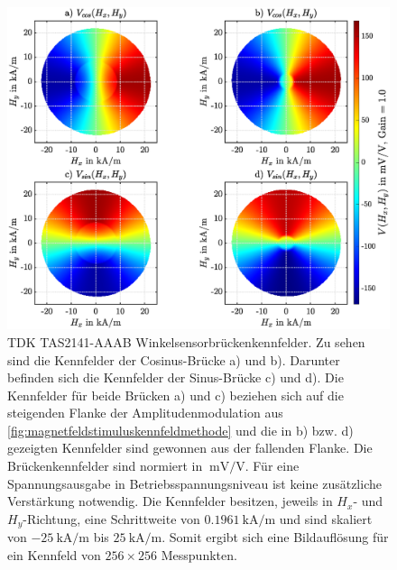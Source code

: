 	
	\clearpage
	\begin{figure}
		\centering
		\includegraphics[width=\linewidth]{chapters/images/TDK_Kennfelder}
		\caption[TDK TAS2141-AAAB Winkelsensorbrückenkennfelder]{TDK TAS2141-AAAB Winkelsensorbrückenkennfelder. Zu 
		sehen sind die Kennfelder der Cosinus-Brücke a) und b). Darunter befinden sich die Kennfelder der Sinus-Brücke 
		c) und d). Die Kennfelder für beide Brücken a) und c) beziehen sich auf die steigenden Flanke der 
		Amplitudenmodulation aus \autoref{fig:magnetfeldstimuluskennfeldmethode} und die in b) bzw. d) gezeigten 
		Kennfelder sind gewonnen aus der fallenden Flanke. Die Brückenkennfelder sind normiert in 
		$\SI{}{\milli\volt\per\volt}$. Für eine Spannungsausgabe in Betriebsspannungsniveau ist keine zusätzliche 
		Verstärkung notwendig. Die Kennfelder besitzen, jeweils in $H_x$- und $H_y$-Richtung, eine Schrittweite von 
		$\SI{0.1961}{\kilo\ampere\per\metre}$ und sind skaliert von $\SI{-25}{\kilo\ampere\per\metre}$ bis 
		$\SI{+25}{\kilo\ampere\per\metre}$. Somit ergibt sich eine Bildauflösung für ein Kennfeld von $256 \times 256$ 
		Messpunkten.}
		\label{fig:tdkkennfelder}
	\end{figure}
	

